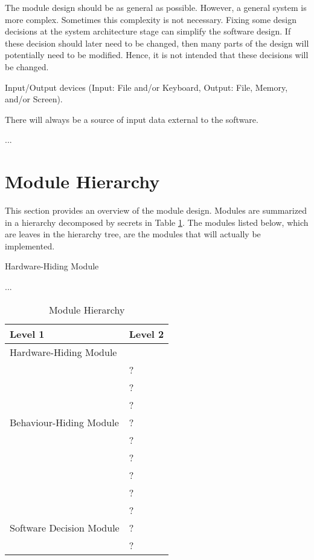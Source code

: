 \documentclass[12pt, titlepage]{article}
\newcounter{ucnum}
\newcommand{\uctheucnum}{UC\theucnum}
\newcounter{mnum}
\newcommand{\mthemnum}{M\themnum}
\begin{document}
The module design should be as general as possible. However, a general system is
more complex. Sometimes this complexity is not necessary. Fixing some design
decisions at the system architecture stage can simplify the software design. If
these decision should later need to be changed, then many parts of the design
will potentially need to be modified. Hence, it is not intended that these
decisions will be changed.

\begin{description}
\item[ \uctheucnum \label{ucIO}:] Input/Output devices
  (Input: File and/or Keyboard, Output: File, Memory, and/or Screen).
\item[ \uctheucnum \label{ucInput}:] There will always be
  a source of input data external to the software.
\item ...
\end{description}

\section{Module Hierarchy} \label{SecMH}

This section provides an overview of the module design. Modules are summarized
in a hierarchy decomposed by secrets in Table \ref{TblMH}. The modules listed
below, which are leaves in the hierarchy tree, are the modules that will
actually be implemented.

\begin{description}
\item [ \mthemnum \label{mHH}:] Hardware-Hiding Module
\item ...
\end{description}


\begin{table}[h!]
\centering
\begin{tabular}{p{} p{}}
\toprule
\textbf{Level 1} & \textbf{Level 2}\\
\midrule

{Hardware-Hiding Module} & ~ \\
\midrule

\multirow{7}{0.3\textwidth}{Behaviour-Hiding Module} & ?\\
& ?\\
& ?\\
& ?\\
& ?\\
& ?\\
& ?\\ 
& ?\\
\midrule

\multirow{3}{0.3\textwidth}{Software Decision Module} & {?}\\
& ?\\
& ?\\
\bottomrule

\end{tabular}
\caption{Module Hierarchy}
\label{TblMH}
\end{table}
\end{document}
